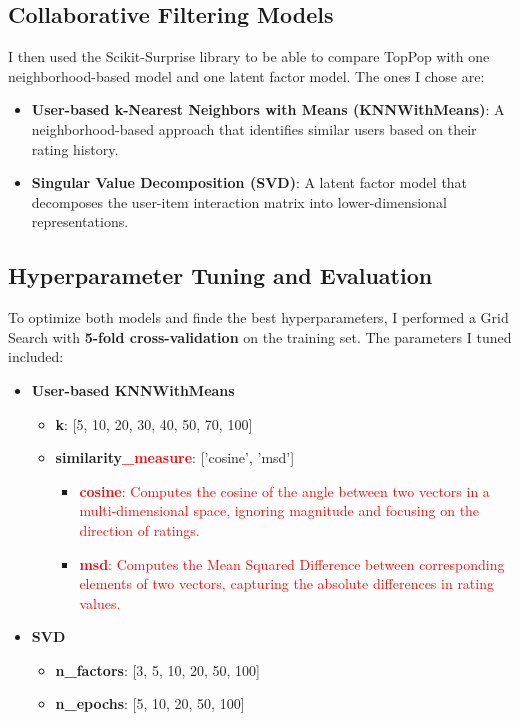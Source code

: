 \documentclass[11pt,a4paper]{article}
\begin{document}
\subsection{Collaborative Filtering Models}

I then used the Scikit-Surprise library\cite{surprise} to be able to compare TopPop with one neighborhood-based model and one latent factor model. The ones I chose are:

\begin{itemize}
    \item \textbf{User-based k-Nearest Neighbors with Means (KNNWithMeans)}: A neighborhood-based approach that identifies similar users based on their rating history.
    \item \textbf{Singular Value Decomposition (SVD)}: A latent factor model that decomposes the user-item interaction matrix into lower-dimensional representations.
\end{itemize}

\subsection{Hyperparameter Tuning and Evaluation}

To optimize both models and finde the best hyperparameters, I performed a Grid Search with \textbf{5-fold cross-validation} on the training set. The parameters I tuned included:

\begin{itemize}
    \item \textbf{User-based KNNWithMeans}
    \begin{itemize}
        \item \textbf{k}: [5, 10, 20, 30, 40, 50, 70, 100]
        \item \textbf{similarity\textcolor{red}{\_measure}}: ['cosine', 'msd']
        \begin{itemize}
            \item \textcolor{red}{\textbf{cosine}: Computes the cosine of the angle between two vectors in a multi-dimensional space, ignoring magnitude and focusing on the direction of ratings.}
            \item \textcolor{red}{\textbf{msd}: Computes the Mean Squared Difference between corresponding elements of two vectors, capturing the absolute differences in rating values.}
        \end{itemize}
            
    \end{itemize}
    \item \textbf{SVD}
    \begin{itemize}
        \item \textbf{n\_factors}: [3, 5, 10, 20, 50, 100]
        \item \textbf{n\_epochs}: [5, 10, 20, 50, 100]
    \end{itemize}
\end{itemize}
\end{document}
